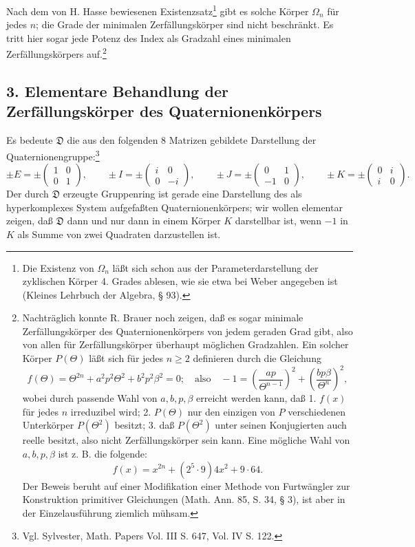 \documentclass[11pt]{article}
\newcommand{\mat}[1]{\begin{pmatrix}#1\end{pmatrix}}
\begin{document}
Nach dem von H. Hasse bewiesenen Existenzsatz\footnote{Die Existenz von $\Omega_n$ läßt sich schon aus der Parameterdarstellung der zyklischen Körper 4. Grades ablesen, wie sie etwa bei Weber angegeben ist (Kleines Lehrbuch der Algebra, § 93).} gibt es solche Körper $\Omega_n$ für jedes $n$; die Grade der minimalen Zerfällungskörper sind nicht beschränkt. Es tritt hier sogar jede Potenz des Index als Gradzahl eines minimalen Zerfällungskörpers auf.\footnote{Nachträglich konnte R. Brauer noch zeigen, daß es sogar minimale Zerfällungskörper des Quaternionenkörpers von jedem geraden Grad gibt, also von allen für Zerfällungskörper überhaupt möglichen Gradzahlen. Ein solcher Körper $P(\Theta)$ läßt sich für jedes $n\ge2$ definieren durch die Gleichung
\[
 f(\Theta)=\Theta^{2n}+a^2p^2\Theta^2+b^2p^2\beta^2=0;
 \quad \text{also}\quad -1=\left(\frac{ap}{\Theta^{n-1}}\right)^2+
       \left(\frac{bp\beta}{\Theta^n}\right)^2,
\]
wobei durch passende Wahl von $a,b,p,\beta$ erreicht werden kann, daß 1. $f(x)$ für jedes $n$ irreduzibel wird; 2. $P(\Theta)$ nur den einzigen von $P$ verschiedenen Unterkörper $P(\Theta^2)$ besitzt; 3. daß $P(\Theta^2)$ unter seinen Konjugierten auch reelle besitzt, also nicht Zerfällungskörper sein kann. Eine mögliche Wahl von $a,b,p,\beta$ ist z. B. die folgende:
\[
        f(x)=x^{2n}+(2^5\cdot9)4x^2+9\cdot64.
\]
Der Beweis beruht auf einer Modifikation einer Methode von Furtwängler zur Konstruktion primitiver Gleichungen (Math. Ann. 85, S. 34, § 3), ist aber in der Einzelausführung ziemlich mühsam.}

\subsection*{3. Elementare Behandlung der Zerfällungskörper des Quaternionenkörpers}

Es bedeute $\mathfrak{D}$ die aus den folgenden 8 Matrizen gebildete Darstellung der Quaternionengruppe:\footnote{Vgl. Sylvester, Math. Papers Vol. III S. 647, Vol. IV S. 122.}
\[
\pm E=\pm\mat{1&0\\0&1},\qquad
\pm I=\pm\mat{i&0\\0&-i},\qquad
\pm J=\pm\mat{0&1\\-1&0},\qquad
\pm K=\pm\mat{0&i\\ i&0}.
\]
Der durch $\mathfrak{D}$ erzeugte Gruppenring ist gerade eine Darstellung des als hyperkomplexes System aufgefaßten Quaternionenkörpers; wir wollen elementar zeigen, daß $\mathfrak{D}$ dann und nur dann in einem Körper $K$ darstellbar ist, wenn $-1$ in $K$ als Summe von zwei Quadraten darzustellen ist.
\end{document}
